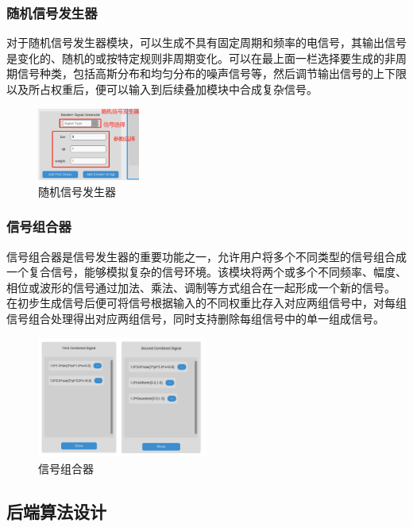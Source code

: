 \documentclass[12pt]{ctexart}
\begin{document}
\subsubsection{随机信号发生器}
对于随机信号发生器模块，可以生成不具有固定周期和频率的电信号，其输出信号是变化的、随机的或按特定规则非周期变化。可以在最上面一栏选择要生成的非周期信号种类，包括高斯分布和均匀分布的噪声信号等，然后调节输出信号的上下限以及所占权重后，便可以输入到后续叠加模块中合成复杂信号。

\begin{figure}[t]
  \centering
  \includegraphics[width=0.3\textwidth]{img/random_signal_genarator.png}
  \caption{随机信号发生器}\label{figure8}
\end{figure}

\subsubsection{信号组合器}
信号组合器是信号发生器的重要功能之一，允许用户将多个不同类型的信号组合成一个复合信号，能够模拟复杂的信号环境。该模块将两个或多个不同频率、幅度、相位或波形的信号通过加法、乘法、调制等方式组合在一起形成一个新的信号。
在初步生成信号后便可将信号根据输入的不同权重比存入对应两组信号中，对每组信号组合处理得出对应两组信号，同时支持删除每组信号中的单一组成信号。
\begin{figure}[h]
  \centering
  \includegraphics[width=0.5\textwidth]{img/combine_signal.png}
  \caption{信号组合器}\label{figure9}
\end{figure}


\subsection{后端算法设计}
\end{document}
